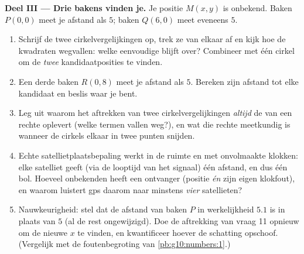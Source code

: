\begin{problem}
\medskip
\noindent\textbf{Deel III --- Drie bakens vinden je.}
Je positie $M(x, y)$ is onbekend. Baken $P(0, 0)$ meet je afstand als $5$;
baken $Q(6, 0)$ meet eveneens $5$.
\begin{enumerate}[resume]
  \item Schrijf de twee cirkelvergelijkingen op, trek ze van elkaar af en
        kijk hoe de kwadraten wegvallen: welke eenvoudige  blijft
        over? Combineer met één cirkel om de \emph{twee} kandidaatposities te
        vinden.
  \item Een derde baken $R(0, 8)$ meet je afstand als $5$. Bereken zijn
        afstand tot elke kandidaat en beslis waar je bent.
  \item Leg uit waarom het aftrekken van twee cirkelvergelijkingen
        \emph{altijd} de  van een rechte oplevert (welke termen
        vallen weg?), en wat die rechte meetkundig is wanneer de cirkels
        elkaar in twee punten snijden.
  \item Echte satellietplaatsbepaling werkt in de ruimte en met onvolmaakte
        klokken: elke satelliet geeft (via de looptijd van het signaal) één
        afstand, en dus één bol. Hoeveel onbekenden heeft een ontvanger
        (positie \emph{én} zijn eigen klokfout), en waarom luistert gps
        daarom naar minstens \emph{vier} satellieten?
  \item Nauwkeurigheid: stel dat de afstand van baken $P$ in werkelijkheid
        $5.1$ is in plaats van $5$ (al de rest ongewijzigd). Doe de
        aftrekking van vraag 11 opnieuw om de nieuwe $x$ te vinden, en
        kwantificeer hoever de schatting opschoof. (Vergelijk met de
        foutenbegroting van \cref{pb:g10:numbers:1}.)
\end{enumerate}


\end{problem}
